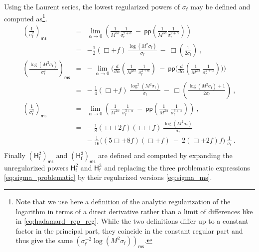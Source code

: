 \documentclass[12pt]{book}
\newcommand{\pp}{\mathsf{pp}}
\newcommand{\ms}{\mathsf{ms}}
\newcommand{\Hsf}{\mathsf{H}}
\newcommand{\fsf}{\mathsf{f}}
\theoremstyle{break}
\begin{document}
Using the Laurent series, the lowest regularized powers of $\sigma_\fsf$ may be defined and computed as\footnote{Note that we use here a definition of the analytic regularization of the logarithm in terms of a direct derivative rather than a limit of differences like in \eqref{eq:hadamard_rep_reg}. While the two definitions differ up to a constant factor in the principal part, they coincide in the constant regular part and thus give the same $(\sigma^{-2}_\fsf \log(M^2 \sigma_\fsf))_\ms$.}. 
%
\begin{eqnarray}
\left(\frac{1}{\sigma_\fsf^2}\right)_\ms &=& \lim_{\alpha\to 0} \left(\frac{1}{M^{2\alpha}} \frac{1}{\sigma^{2+\alpha}_\fsf} \ - \ \pp\left(\frac{1}{M^{2\alpha}} \frac{1}{\sigma^{2+\alpha}_\fsf}\right)\right) \nonumber \\
&=& - \frac12 (\Box+f) \ \frac{\log \left(M^2 \sigma_\fsf\right)}{\sigma_\fsf} \ - \ \Box\left(\frac{1}{2\sigma_\fsf}\right) \ , \nonumber \\
%
%
\left(\frac{\log\left(M^2\sigma_\fsf\right)}{\sigma_\fsf^2}\right)_\ms &=& - \ \lim_{\alpha\to 0} \Bigg( \frac{d}{d\alpha}\left(\frac{1}{M^{2\alpha}} \ \frac{1}{\sigma^{2+\alpha}_\fsf}\right) \ - \ \pp\bigg(\frac{d}{d\alpha} \left( \frac{1}{M^{2\alpha}} \ \frac{1}{\sigma^{2+\alpha}_\fsf}\right) \bigg) \Bigg) \nonumber \\ 
&=& - \ \frac14 \left(\Box+f\right) \ \frac{\log^2\left(M^2 \sigma_\fsf\right)}{\sigma_\fsf} \ - \ \Box\left(\frac{\log \left(M^2 \sigma_\fsf\right)+1}{2\sigma_\fsf}\right) \ , \nonumber \\
%
%
\left(\frac{1}{\sigma_\fsf^3}\right)_\ms &=& \lim_{\alpha\to 0} \left( \frac{1}{M^{2\alpha}} \ \frac{1}{\sigma^{3+\alpha}_\fsf} \ - \ \pp\left(\frac{1}{M^{2\alpha}} \ \frac{1}{\sigma^{3+\alpha}_\fsf} \right)\right) \ , \nonumber \\
&=& - \ \frac18 (\Box+2f) (\Box+f) \ \frac{\log\left(M^2 \sigma_\fsf\right)}{\sigma_\fsf} \nonumber \\ 
&& - \ \frac{1}{16} \bigg( (5\Box+8f)(\Box+f) \ - \ 2(\Box+2f)f \bigg) \ \frac{1}{\sigma_\fsf} \ . \nonumber \\
\label{eq:sigma_ms}
\end{eqnarray}
%
Finally $\left(\Hsf^2_\fsf\right)_\ms$ and $\left(\Hsf^3_\fsf\right)_\ms$ are defined and computed by expanding the unregularized powers $\Hsf^2_\fsf$ and $\Hsf^3_\fsf$ and replacing the three problematic expressions \eqref{eq:sigma_problematic} by their regularized versions \eqref{eq:sigma_ms}.


\end{document}
